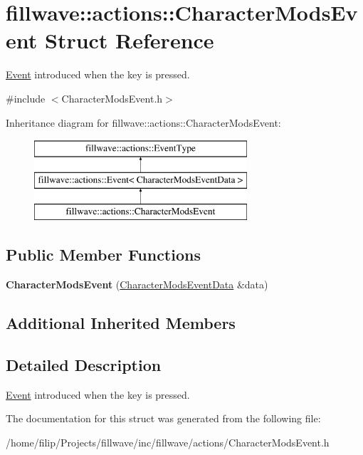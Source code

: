 \hypertarget{classfillwave_1_1actions_1_1CharacterModsEvent}{}\section{fillwave\+:\+:actions\+:\+:Character\+Mods\+Event Struct Reference}
\label{classfillwave_1_1actions_1_1CharacterModsEvent}


\hyperlink{classfillwave_1_1actions_1_1Event}{Event} introduced when the key is pressed.  




{\ttfamily \#include $<$Character\+Mods\+Event.\+h$>$}

Inheritance diagram for fillwave\+:\+:actions\+:\+:Character\+Mods\+Event\+:\begin{figure}[H]
\begin{center}
\leavevmode
\includegraphics[height=3.000000cm]{classfillwave_1_1actions_1_1CharacterModsEvent}
\end{center}
\end{figure}
\subsection*{Public Member Functions}
\begin{DoxyCompactItemize}
\item 
\hypertarget{classfillwave_1_1actions_1_1CharacterModsEvent_ae4695d3a663f83a99b9962b7b2d89303}{}{\bfseries Character\+Mods\+Event} (\hyperlink{structfillwave_1_1actions_1_1CharacterModsEventData}{Character\+Mods\+Event\+Data} \&data)\label{classfillwave_1_1actions_1_1CharacterModsEvent_ae4695d3a663f83a99b9962b7b2d89303}

\end{DoxyCompactItemize}
\subsection*{Additional Inherited Members}


\subsection{Detailed Description}
\hyperlink{classfillwave_1_1actions_1_1Event}{Event} introduced when the key is pressed. 

The documentation for this struct was generated from the following file\+:\begin{DoxyCompactItemize}
\item 
/home/filip/\+Projects/fillwave/inc/fillwave/actions/Character\+Mods\+Event.\+h\end{DoxyCompactItemize}
